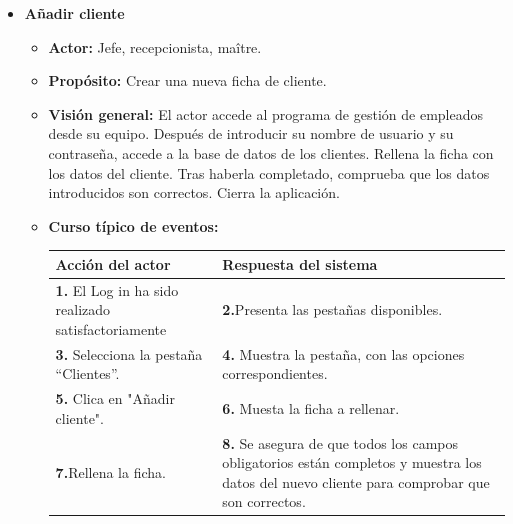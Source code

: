 \documentclass[spanish,a4paper,12pt]{report}		%
\begin{document}
\begin{itemize}
	\newpage
	\item \textbf{Añadir cliente} \\		%
		
		\hspace{-1.2 true cm}	
			\begin{itemize}
			\item \textbf{Actor:} Jefe, recepcionista, maître.
			\item \textbf{Propósito: } Crear una nueva ficha de cliente.
			\item \textbf{Visión general:} El actor accede al programa de gestión de empleados desde su equipo. Después de introducir su nombre de usuario y su contraseña, accede a la base de datos de los clientes. Rellena la ficha con los datos del cliente. Tras haberla completado, comprueba que los datos introducidos son correctos. Cierra la aplicación. 
			\item \textbf{Curso típico de eventos:} 	\\
				\begin{tabular}{|p{6cm}||p{6cm}|}
				\hline
				\textbf{Acción del actor} & \textbf{Respuesta del sistema} \\ \hline \hline
				\textbf{1.} El Log in ha sido realizado satisfactoriamente & \textbf{2.}Presenta las pestañas disponibles.\\ \hline 
				\textbf{3.} Selecciona la pestaña “Clientes”. & \textbf{4.} Muestra la pestaña, con las opciones correspondientes. \\ \hline
				\textbf{5.} Clica en "Añadir cliente".	& \textbf{6.} Muesta la ficha a rellenar. \\ \hline
				\textbf{7.}Rellena la ficha. & \textbf{8.} Se asegura de que todos los campos obligatorios están completos y muestra los datos del nuevo cliente para comprobar que son correctos.\\ \hline

\end{tabular}
\end{itemize}
\end{itemize}
\end{document}
